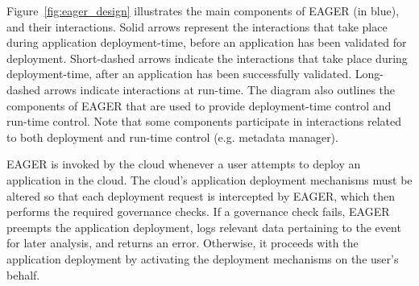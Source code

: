 
Figure~\ref{fig:eager_design} illustrates the main components of EAGER (in
blue), and their interactions. Solid arrows represent the interactions that take place
during application deployment-time, before an application has been validated
for deployment. Short-dashed arrows indicate the interactions that take place
during deployment-time, after an application has been successfully validated.
Long-dashed arrows indicate interactions at run-time. The diagram also outlines the
components of EAGER that are used to provide deployment-time  control and run-time control.
Note that some components participate in interactions related to both deployment and
run-time control (e.g. metadata manager).

EAGER is invoked by the cloud whenever a user
attempts to deploy an application in the cloud.
The cloud's application deployment mechanisms must be altered so that
each deployment request is
intercepted by EAGER, which then performs the required governance checks.
If a governance check fails, EAGER preempts the application deployment,
logs relevant data pertaining to the event for later analysis,  and
returns an error. Otherwise, it proceeds with the application deployment by
activating the deployment mechanisms on the user's 
behalf. 

